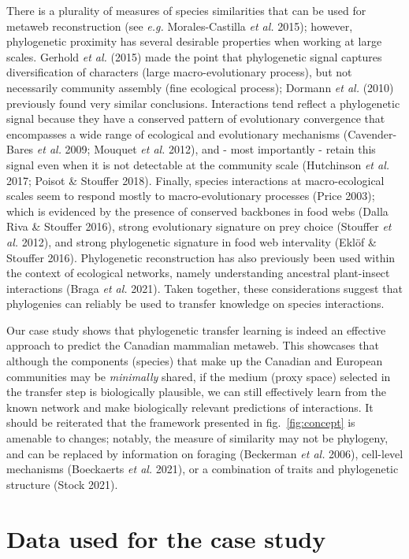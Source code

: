 \documentclass[11pt]{article}
\begin{document}
There is a plurality of measures of species similarities that can be
used for metaweb reconstruction (see \emph{e.g.} Morales-Castilla
\emph{et al.} 2015); however, phylogenetic proximity has several
desirable properties when working at large scales. Gerhold \emph{et al.}
(2015) made the point that phylogenetic signal captures diversification
of characters (large macro-evolutionary process), but not necessarily
community assembly (fine ecological process); Dormann \emph{et al.}
(2010) previously found very similar conclusions. Interactions tend
reflect a phylogenetic signal because they have a conserved pattern of
evolutionary convergence that encompasses a wide range of ecological and
evolutionary mechanisms (Cavender-Bares \emph{et al.} 2009; Mouquet
\emph{et al.} 2012), and - most importantly - retain this signal even
when it is not detectable at the community scale (Hutchinson \emph{et
al.} 2017; Poisot \& Stouffer 2018). Finally, species interactions at
macro-ecological scales seem to respond mostly to macro-evolutionary
processes (Price 2003); which is evidenced by the presence of conserved
backbones in food webs (Dalla Riva \& Stouffer 2016), strong
evolutionary signature on prey choice (Stouffer \emph{et al.} 2012), and
strong phylogenetic signature in food web intervality (Eklöf \& Stouffer
2016). Phylogenetic reconstruction has also previously been used within
the context of ecological networks, namely understanding ancestral
plant-insect interactions (Braga \emph{et al.} 2021). Taken together,
these considerations suggest that phylogenies can reliably be used to
transfer knowledge on species interactions.

Our case study shows that phylogenetic transfer learning is indeed an
effective approach to predict the Canadian mammalian metaweb. This
showcases that although the components (species) that make up the
Canadian and European communities may be \emph{minimally} shared, if the
medium (proxy space) selected in the transfer step is biologically
plausible, we can still effectively learn from the known network and
make biologically relevant predictions of interactions. It should be
reiterated that the framework presented in fig.~\ref{fig:concept} is
amenable to changes; notably, the measure of similarity may not be
phylogeny, and can be replaced by information on foraging (Beckerman
\emph{et al.} 2006), cell-level mechanisms (Boeckaerts \emph{et al.}
2021), or a combination of traits and phylogenetic structure (Stock
2021).

\hypertarget{data-used-for-the-case-study}{%
\section{Data used for the case
study}\label{data-used-for-the-case-study}}
\end{document}
